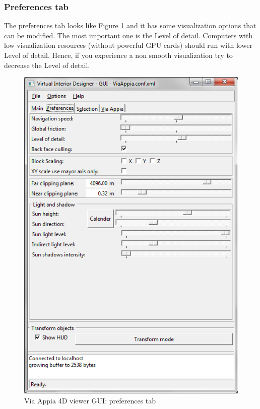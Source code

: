 \documentclass[a4paper,11pt]{article}
\begin{document}
\subsubsection{Preferences tab}

The preferences tab looks like Figure \ref{fig-guipref} and it has some visualization options that can be modified. The most important one is the Level of detail. Computers with low visualization resources (without powerful GPU cards) should run with lower Level of detail. Hence, if you experience a non smooth visualization try to decrease the Level of detail.

\begin{figure}[!ht]
\centering
\includegraphics[scale=0.5]{fig/preferences}
\caption{Via Appia 4D viewer GUI: preferences tab}
\label{fig-guipref}
\end{figure}
\end{document}
